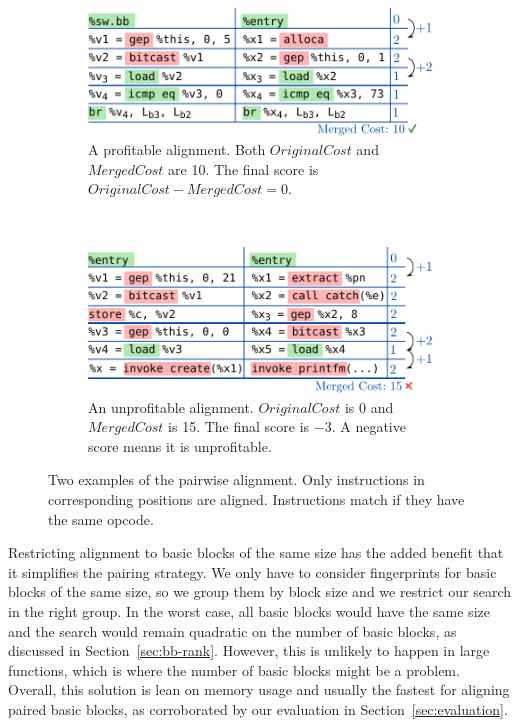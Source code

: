 \begin{figure}[h]
\centering
  \begin{subfigure}{\linewidth}
  \center
  \includegraphics[width=0.6\linewidth]{src/lctes21/figs/hyfm-alignment-good.pdf}
  \caption{A profitable alignment. Both $OriginalCost$ and $MergedCost$ are 10. The final score is $OriginalCost - MergedCost = 0$.}
  \label{fig:hyfm-alignment-good}
  \end{subfigure}
\\
  \begin{subfigure}{\linewidth}
  \center
  \includegraphics[width=0.6\linewidth]{src/lctes21/figs/hyfm-alignment-bad.pdf}
  \caption{An unprofitable alignment. $OriginalCost$ is 0 and $MergedCost$ is 15. The final score is $-3$. A negative score means it is unprofitable.}
  \label{fig:hyfm-alignment-bad}
  \end{subfigure}
\vspace{-2ex}
\caption{Two examples of the pairwise alignment. Only instructions in corresponding positions are aligned. Instructions match if they have the same opcode.}
 \label{fig:hyfm-alignment}
\end{figure}

Restricting alignment to basic blocks of the same size has the added benefit that it simplifies the pairing strategy. We only have to consider fingerprints for basic blocks of the same size, so we group them by block size and we restrict our search in the right group.
In the worst case, all basic blocks would have the same size and the search would remain quadratic on the number of basic blocks, as discussed in Section~\ref{sec:bb-rank}.
However, this is unlikely to happen in large functions, which is where the number of basic blocks might be a problem.
Overall, this solution is lean on memory usage and usually the fastest for aligning paired basic blocks, as corroborated by our evaluation in 
Section~\ref{sec:evaluation}.


